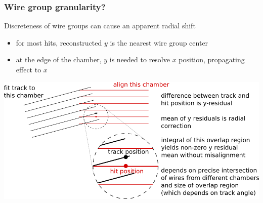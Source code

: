 \documentclass[compress]{beamer}
\begin{document}
\begin{frame}
\frametitle{Wire group granularity?}

Discreteness of wire groups can cause an apparent radial shift

\begin{itemize}
\item for most hits, reconstructed $y$ is the nearest wire group center
\item at the edge of the chamber, $y$ is needed to resolve $x$
  position, propagating effect to $x$
\end{itemize}

\vfill
\includegraphics[width=\linewidth]{vertical_residual.png}

\end{frame}
\end{document}
